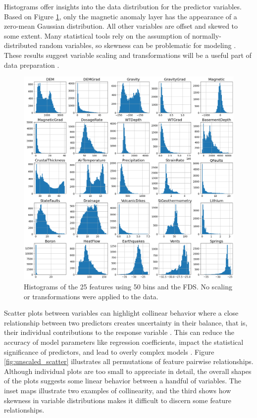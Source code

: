 Histograms offer insights into the data distribution for the predictor variables. Based on Figure \ref{fig:unscaled_hists}, only the magnetic anomaly layer has the appearance of a zero-mean Gaussian distribution. All other variables are offset and skewed to some extent. Many statistical tools rely on the assumption of normally-distributed random variables, so skewness can be problematic for modeling \citep[~p. 85]{montgomery_statistical_2012}.  These results suggest variable scaling and transformations will be a useful part of data preparation \citep[~p. 221]{montgomery_statistical_2012}. 

\begin{figure}[!htp]
\centering
\includegraphics[width=\textwidth]{templates/images/Figure-Unscaled_Histograms.png}
\caption[Unscaled FDS histograms]{Histograms of the 25 features using 50 bins and the FDS. No scaling or transformations were applied to the data.}
\label{fig:unscaled_hists}
\end{figure}

Scatter plots between variables can highlight collinear behavior where a close relationship between two predictors creates uncertainty in their balance, that is, their individual contributions to the response variable \citep[~p. 99]{james_introduction_2013}. This can reduce the accuracy of model parameters like regression coefficients, impact the statistical significance of predictors, and lead to overly complex models \citep[~p. 100-101]{james_introduction_2013}. Figure \ref{fig:unscaled_scatter} illustrates all permutations of feature pairwise relationships. Although individual plots are too small to appreciate in detail, the overall shapes of the plots suggests some linear behavior between a handful of variables. The inset maps illustrate two examples of collinearity, and the third shows how skewness in variable distributions makes it difficult to discern some feature relationships.

